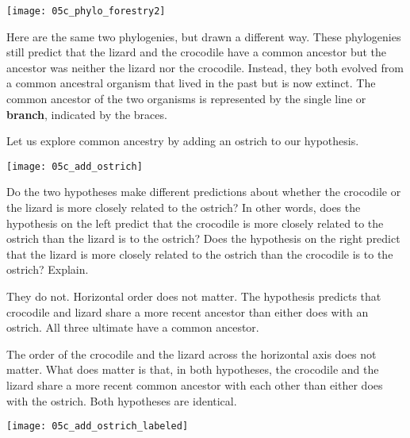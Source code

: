 \documentclass[12pt, hidelinks]{exam}
\newcommand*\AnswerBox[2]{%
    \parbox[t][#1]{0.92\textwidth}{%
    \begin{solution}#2\end{solution}}
    \vspace{\stretch{1}}
}
\begin{document}

\begin{center}%

	\noindent\texttt{[image: 05c\_phylo\_forestry2]}
\end{center}

Here are the same two phylogenies, but drawn a different way. These
phylogenies still predict that the lizard and the crocodile have a
common ancestor but the ancestor was neither the lizard nor the
crocodile. Instead, they both evolved from a common ancestral organism
that lived in the past but is now extinct. The common ancestor of the
two organisms is represented by the single line or \textbf{branch}, indicated
 by the braces.

Let us explore common ancestry by adding an ostrich to our hypothesis.


\begin{center}
	\noindent\texttt{[image: 05c\_add\_ostrich]}
\end{center}

\begin{questions}
\setcounter{question}{2}

\question
Do the two hypotheses make different predictions about
whether the crocodile or the lizard is more closely related to the
ostrich? In other words, does the hypothesis on the left predict that
the crocodile is more closely related to the ostrich than the lizard is
to the ostrich? Does the hypothesis on the right predict that the lizard
is more closely related to the ostrich than the crocodile is to the
ostrich? Explain.

\AnswerBox{5\baselineskip}{They do not. Horizontal order does not
matter. The hypothesis predicts that crocodile and lizard share a more
recent ancestor than either does with an ostrich. All three ultimate have
a common ancestor.}

\end{questions}

The order of the crocodile and the lizard across the horizontal axis
does not matter. What does matter is that, in both hypotheses, the
crocodile and the lizard share a more recent common ancestor with each
other than either does with the ostrich. Both hypotheses are identical.

\begin{center}
	\noindent\texttt{[image: 05c\_add\_ostrich\_labeled]}
\end{center}
\end{document}
